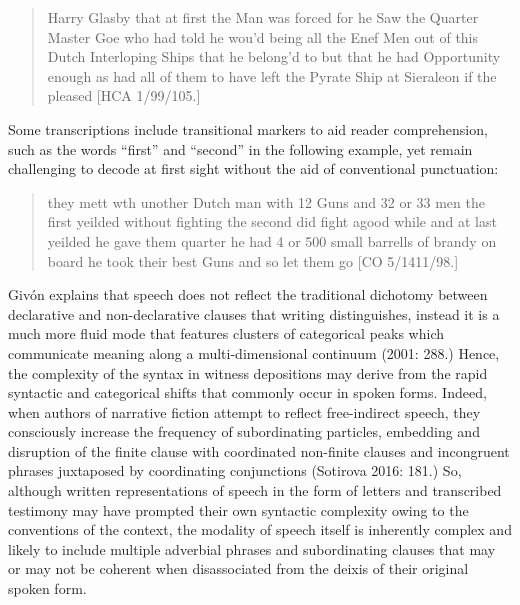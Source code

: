 \documentclass[12pt]{article}
\newenvironment{styleStandard}{\renewcommand\baselinestretch{1.0}\setlength\leftskip{0cm}\setlength\rightskip{0cm plus 1fil}\setlength\parindent{0cm}\setlength\parfillskip{0pt plus 1fil}\setlength\parskip{0in plus 1pt}\writerlistparindent\writerlistleftskip\leavevmode\normalfont\normalsize\writerlistlabel\ignorespaces}{\unskip\vspace{0in plus 1pt}\par}
\newcommand\writerlistleftskip{}
\newcommand\writerlistparindent{}
\newcommand\writerlistlabel{}
\begin{document}
\begin{quotation}
Harry Glasby that at first the Man was forced for he Saw the Quarter Master Goe who had told he wou’d being all the Enef Men out of this Dutch Interloping Ships that he belong’d to but that he had Opportunity enough as had all of them to have left the Pyrate Ship at Sieraleon if the pleased [HCA 1/99/105.]

\end{quotation}
\begin{styleStandard}
Some transcriptions include transitional markers to aid reader comprehension, such as the words “first” and “second” in the following example, yet remain challenging to decode at first sight without the aid of conventional punctuation: 
\end{styleStandard}


\begin{quotation}
they mett wth unother Dutch man with 12 Guns and 32 or 33 men the first yeilded without fighting the second did fight agood while and at last yeilded he gave them quarter he had 4 or 500 small barrells of brandy on board he took their best Guns and so let them go [CO 5/1411/98.]

\end{quotation}
\begin{styleStandard}
Givón explains that speech does not reflect the traditional dichotomy between declarative and non-declarative clauses that writing distinguishes, instead it is a much more fluid mode that features clusters of categorical peaks which communicate meaning along a multi-dimensional continuum (2001: 288.) Hence, the complexity of the syntax in witness depositions may derive from the rapid syntactic and categorical shifts that commonly occur in spoken forms. Indeed, when authors of narrative fiction attempt to reflect free-indirect speech, they consciously increase the frequency of subordinating particles, embedding and disruption of the finite clause with coordinated non-finite clauses and incongruent phrases juxtaposed by coordinating conjunctions (Sotirova 2016: 181.) So, although written representations of speech in the form of letters and transcribed testimony may have prompted their own syntactic complexity owing to the conventions of the context, the modality of speech itself is inherently complex and likely to include multiple adverbial phrases and subordinating clauses that may or may not be coherent when disassociated from the deixis of their original spoken form. \ \ 
\end{styleStandard}
\end{document}
